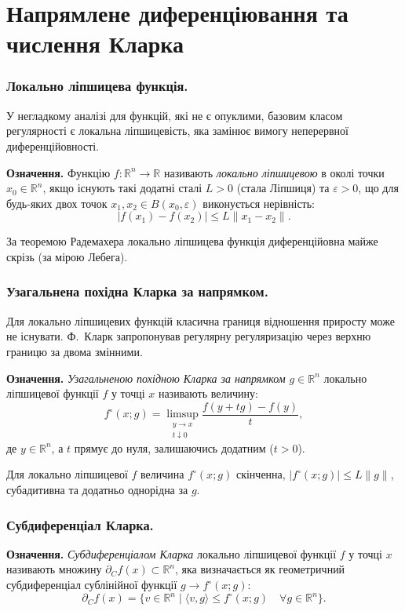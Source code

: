 \documentclass[12pt,a4paper]{extarticle}
\numberwithin{section}{part}
\begin{document}
\part{Напрямлене диференціювання та числення Кларка}

\section{Локально ліпшицева функція.}
У негладкому аналізі для функцій, які не є опуклими, базовим класом регулярності є локальна ліпшицевість, яка замінює вимогу неперервної диференційовності.

\textbf{Означення.} Функцію $f: \mathbb{R}^n \to \mathbb{R}$ називають \textit{локально ліпшицевою} в околі точки $x_0 \in \mathbb{R}^n$, якщо існують такі додатні сталі $L > 0$ (стала Ліпшиця) та $\varepsilon > 0$, що для будь-яких двох точок $x_1, x_2 \in B(x_0, \varepsilon)$ виконується нерівність:
$$
|f(x_1) - f(x_2)| \leq L \|x_1 - x_2\|.
$$

За теоремою Радемахера локально ліпшицева функція диференційовна майже скрізь (за мірою Лебега).

\section{Узагальнена похідна Кларка за напрямком.}
Для локально ліпшицевих функцій класична границя відношення приросту може не існувати. Ф.~Кларк запропонував регулярну регуляризацію через верхню границю за двома змінними.

\textbf{Означення.} \textit{Узагальненою похідною Кларка за напрямком} $g \in \mathbb{R}^n$ локально ліпшицевої функції $f$ у точці $x$ називають величину:
$$
f^{\circ}(x; g) = \limsup_{\substack{y \to x \\ t \downarrow 0}} \frac{f(y + tg) - f(y)}{t},
$$
де $y \in \mathbb{R}^n$, а $t$ прямує до нуля, залишаючись додатним ($t > 0$).

Для локально ліпшицевої $f$ величина $f^{\circ}(x; g)$ скінченна, $|f^{\circ}(x; g)| \leq L\|g\|$, субадитивна та додатньо однорідна за $g$.

\section{Субдиференціал Кларка.}
\textbf{Означення.} \textit{Субдиференціалом Кларка} локально ліпшицевої функції $f$ у точці $x$ називають множину $\partial_C f(x) \subset \mathbb{R}^n$, яка визначається як геометричний субдиференціал сублінійної функції $g \to f^{\circ}(x; g)$:
$$
\partial_C f(x) = \{ v \in \mathbb{R}^n \mid \langle v, g \rangle \leq f^{\circ}(x; g) \quad \forall g \in \mathbb{R}^n \}.
$$
\end{document}
